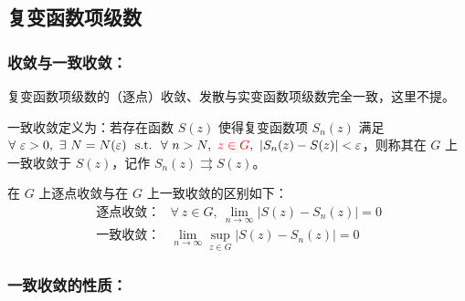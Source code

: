 \documentclass[UTF8]{report}
\theoremstyle{MyLineTheoremStyle} %
\theoremstyle{MyBlockTheoremStyle} %
\theoremstyle{MySubsubsectionStyle} %
\begin{document}
\subsection{复变函数项级数}


\subsubsection{收敛与一致收敛：}
复变函数项级数的（逐点）收敛、发散与实变函数项级数完全一致，这里不提。

一致收敛定义为：若存在函数 $S(z)$ 使得复变函数项 $S_n(z)$ 满足 $\forall\ \varepsilon > 0,\ \exists\ N = N(\varepsilon)\ \ \text{s.t.}\ \ \forall\ n > N,\ {\color{red} z \in G},\ | S_n(z) - S(z) | < \varepsilon$，则称其在 $G$ 上一致收敛于 $S(z)$，记作 $S_n(z) \rightrightarrows S(z) $。

在 $G$ 上逐点收敛与在 $G$ 上一致收敛的区别如下：
\begin{align}
\ \text{逐点收敛：}& \forall\ z \in G,\ \lim_{n \to \infty} \left| S(z) -  S_n(z)\right| = 0
\\
\ \text{一致收敛：}& \lim_{n \to \infty} \sup_{z \in G} \left| S(z) -  S_n(z)\right| = 0
\end{align}

\subsubsection{一致收敛的性质：}
\end{document}
